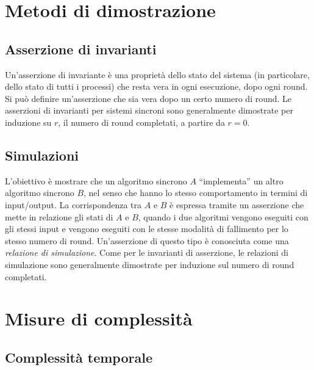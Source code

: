 \documentclass[italian,]{book}
\begin{document}
\hypertarget{metodi-di-dimostrazione}{%
\section{Metodi di dimostrazione}\label{metodi-di-dimostrazione}}

\hypertarget{asserzione-di-invarianti}{%
\subsection*{Asserzione di invarianti}\label{asserzione-di-invarianti}}

Un'asserzione di invariante è una proprietà dello stato del sistema (in
particolare, dello stato di tutti i processi) che resta vera in ogni
esecuzione, dopo ogni round. Si può definire un'asserzione che sia vera
dopo un certo numero di round. Le asserzioni di invarianti per sistemi
sincroni sono generalmente dimostrate per induzione su \(r\), il numero
di round completati, a partire da \(r = 0\).

\hypertarget{simulazioni}{%
\subsection*{Simulazioni}\label{simulazioni}}

L'obiettivo è mostrare che un algoritmo sincrono \(A\) ``implementa'' un
altro algoritmo sincrono \(B\), nel senso che hanno lo stesso
comportamento in termini di input/output. La corrispondenza tra \(A\) e
\(B\) è espressa tramite un asserzione che mette in relazione gli stati
di \(A\) e \(B\), quando i due algoritmi vengono eseguiti con gli stessi
input e vengono eseguiti con le stesse modalità di fallimento per lo
stesso numero di round. Un'asserzione di questo tipo è conosciuta come
una \emph{relazione di simulazione}. Come per le invarianti di
asserzione, le relazioni di simulazione sono generalmente dimostrate per
induzione sul numero di round completati.

\hypertarget{misure-di-complessituxe0}{%
\section{Misure di complessità}\label{misure-di-complessituxe0}}

\hypertarget{complessituxe0-temporale}{%
\subsection*{Complessità temporale}\label{complessituxe0-temporale}}
\end{document}
